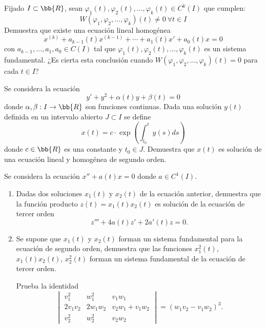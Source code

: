 \begin{ejercicio}\label{ej:4.6}
    Fijado $I\subset \bb{R}$, sean $\varphi_1(t), \varphi_2(t), \ldots, \varphi_k(t)\in C^k(I)$ que cumplen:
    $$W(\varphi_1, \varphi_2, \ldots, \varphi_k)(t) \neq 0~\forall t \in I$$
    Demuestra que existe una ecuación lineal homogénea
    \[
        x^{(k)} + a_{k-1}(t)x^{(k-1)} + \cdots + a_1(t)x' + a_0(t)x = 0
    \]
    con $a_{k-1}, \ldots, a_1, a_0 \in C(I)$ tal que $\varphi_1(t), \varphi_2(t), \ldots, \varphi_k(t)$ es un sistema fundamental. ¿Es cierta esta conclusión cuando $W(\varphi_1, \varphi_2, \ldots, \varphi_k)(t) = 0$ para cada $t \in I$?
\end{ejercicio}

\begin{ejercicio}\label{ej:4.7}
    Se considera la ecuación
    \[
        y' + y^2 + \alpha(t)y + \beta(t) = 0
    \]
    donde $\alpha, \beta : I \to \bb{R}$ son funciones continuas. Dada una solución $y(t)$ definida en un intervalo abierto $J \subset I$ se define
    \[
        x(t) = c\cdot \exp\left(\int_{t_0}^t y(s)ds\right)
    \]
    donde $c\in \bb{R}$ es una constante y $t_0 \in J$. Demuestra que $x(t)$ es solución de una ecuación lineal y homogénea de segundo orden.
\end{ejercicio}

\begin{ejercicio}\label{ej:4.8}
    Se considera la ecuación $x'' + a(t)x = 0$ donde $a \in C^1(I)$.
    \begin{enumerate}
        \item Dadas dos soluciones $x_1(t)$ y $x_2(t)$ de la ecuación anterior, demuestra que la función producto $z(t) = x_1(t)x_2(t)$ es solución de la ecuación de tercer orden
        \[
            z''' + 4a(t)z' + 2a'(t)z = 0.
        \]
        \item Se supone que $x_1(t)$ y $x_2(t)$ forman un sistema fundamental para la ecuación de segundo orden, demuestra que las funciones $x_1^2(t)$, $x_1(t)x_2(t)$, $x_2^2(t)$ forman un sistema fundamental de la ecuación de tercer orden.
        \begin{observacion}
            Prueba la identidad
            \[
                \begin{vmatrix}
                    v_1^2 & w_1^2 & v_1w_1\\
                    2v_1v_2 & 2w_1w_2 & v_2w_1 + v_1w_2\\
                    v_2^2 & w_2^2 & v_2w_2
                \end{vmatrix} = (w_1v_2 - v_1w_2)^3.
            \]
        \end{observacion}
    \end{enumerate}
\end{ejercicio}

